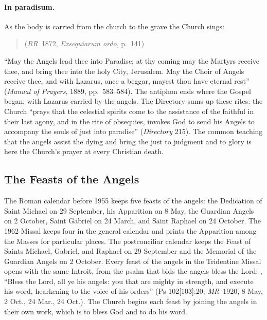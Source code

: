 \paragraph{In paradisum.} As the body is carried from the church to the
grave the Church sings:
\begin{quote}
(\emph{RR}~1872, \emph{Exsequiarum ordo}, p.~141)
\end{quote}
``May the Angels lead thee into Paradise; at thy coming may the Martyrs
receive thee, and bring thee into the holy City, Jerusalem. May the Choir
of Angels receive thee, and with Lazarus, once a beggar, mayest thou have
eternal rest'' (\emph{Manual of Prayers}, 1889, pp.~583--584). The
antiphon ends where the Gospel began, with Lazarus carried by the angels.
The Directory sums up these rites: the Church ``prays that the celestial
spirits come to the assistance of the faithful in their last agony, and
in the rite of obsequies, invokes God to send his Angels to accompany the
souls of just into paradise'' (\emph{Directory} 215). The common teaching
that the angels assist the dying and bring the just to judgment and to
glory is here the Church's prayer at every Christian death.

\sectionguard
\subsection{The Feasts of the Angels}

The Roman calendar before 1955 keeps five feasts of the angels: the
Dedication of Saint Michael on 29 September, his Apparition on 8 May, the
Guardian Angels on 2 October, Saint Gabriel on 24 March, and Saint
Raphael on 24 October. The 1962 Missal keeps four in the general calendar
and prints the Apparition among the Masses for particular places. The
postconciliar calendar keeps the Feast of Saints Michael, Gabriel, and
Raphael on 29 September and the Memorial of the Guardian Angels on 2
October. Every feast of the angels in the Tridentine Missal opens with
the same Introit, from the psalm that bids the angels bless the Lord:
, ``Bless the Lord,
all ye his angels: you that are mighty in strength, and execute his word,
hearkening to the voice of his orders'' (Ps 102[103]:20; \emph{MR}~1920,
8 May, 2 Oct., 24 Mar., 24 Oct.). The Church begins each feast by
joining the angels in their own work, which is to bless God and to do his
word.

